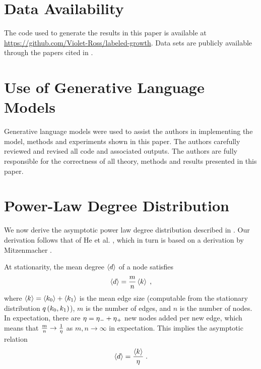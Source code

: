 \documentclass[aps,pre,reprint,superscriptaddress,nofootinbib]{revtex4-2}
\begin{document}
\section*{Data Availability}

    The code used to generate the results in this paper is available at \url{https://github.com/Violet-Ross/labeled-growth}.
    Data sets are publicly available through the papers cited in .

\section*{Use of Generative Language Models}

    Generative language models were used to assist the authors in implementing the model, methods and experiments shown in this paper. 
    The authors carefully reviewed and revised all code and associated outputs. 
    The authors are fully responsible for the correctness of all theory, methods and results presented in this paper.
    

 

\appendix



    

\section{Power-Law Degree Distribution} \label{sec:degree-distribution-appendix}

    We now derive the asymptotic power law degree distribution described in . 
    Our derivation follows that of He et al. \cite{heEdgeCorrelationsLink2025}, which in turn is based on a derivation by Mitzenmacher \cite{mitzenmacherBriefHistoryGenerative2004}.

    At stationarity, the mean degree $\left\langle d \right\rangle$ of a node satisfies 
    \begin{align}
        \left\langle d \right\rangle = \frac{m}{n}\left\langle k \right\rangle \;,
    \end{align}
    where $\left\langle k \right\rangle = \left\langle k_0 \right\rangle + \left\langle k_1 \right\rangle$ is the mean edge size (computable from the stationary distribution $q \left( k_0,k_1 \right)$), $m$ is the number of edges, and $n$ is the number of nodes.
    In expectation, there are $\eta{} = \eta{}_- + \eta{}_+$ new nodes added per new edge, which means that $\frac{m}{n} \to \frac{1}{\eta{}}$ as $m, n \to \infty$ in expectation.
    This implies the asymptotic relation
    \begin{align}
        \left\langle d \right\rangle = \frac{\left\langle k \right\rangle}{\eta{}} \;. \label{eq:average-degree}
    \end{align}
\end{document}
